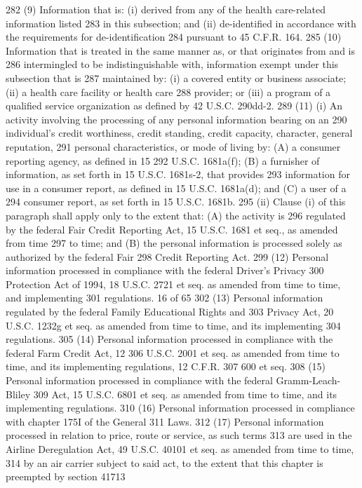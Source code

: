282 (9) Information that is: (i) derived from any of the health care-related information listed
283 in this subsection; and (ii) de-identified in accordance with the requirements for de-identification
284 pursuant to 45 C.F.R. 164.
285 (10) Information that is treated in the same manner as, or that originates from and is
286 intermingled to be indistinguishable with, information exempt under this subsection that is
287 maintained by: (i) a covered entity or business associate; (ii) a health care facility or health care
288 provider; or (iii) a program of a qualified service organization as defined by 42 U.S.C. 290dd-2.
289 (11) (i) An activity involving the processing of any personal information bearing on an
290 individual’s credit worthiness, credit standing, credit capacity, character, general reputation,
291 personal characteristics, or mode of living by: (A) a consumer reporting agency, as defined in 15
292 U.S.C. 1681a(f); (B) a furnisher of information, as set forth in 15 U.S.C. 1681s-2, that provides
293 information for use in a consumer report, as defined in 15 U.S.C. 1681a(d); and (C) a user of a
294 consumer report, as set forth in 15 U.S.C. 1681b.
295 (ii) Clause (i) of this paragraph shall apply only to the extent that: (A) the activity is
296 regulated by the federal Fair Credit Reporting Act, 15 U.S.C. 1681 et seq., as amended from time
297 to time; and (B) the personal information is processed solely as authorized by the federal Fair
298 Credit Reporting Act.
299 (12) Personal information processed in compliance with the federal Driver’s Privacy
300 Protection Act of 1994, 18 U.S.C. 2721 et seq. as amended from time to time, and implementing
301 regulations.
16 of 65
302 (13) Personal information regulated by the federal Family Educational Rights and
303 Privacy Act, 20 U.S.C. 1232g et seq. as amended from time to time, and its implementing
304 regulations.
305 (14) Personal information processed in compliance with the federal Farm Credit Act, 12
306 U.S.C. 2001 et seq. as amended from time to time, and its implementing regulations, 12 C.F.R.
307 600 et seq.
308 (15) Personal information processed in compliance with the federal Gramm-Leach-Bliley
309 Act, 15 U.S.C. 6801 et seq. as amended from time to time, and its implementing regulations.
310 (16) Personal information processed in compliance with chapter 175I of the General
311 Laws.
312 (17) Personal information processed in relation to price, route or service, as such terms
313 are used in the Airline Deregulation Act, 49 U.S.C. 40101 et seq. as amended from time to time,
314 by an air carrier subject to said act, to the extent that this chapter is preempted by section 41713
